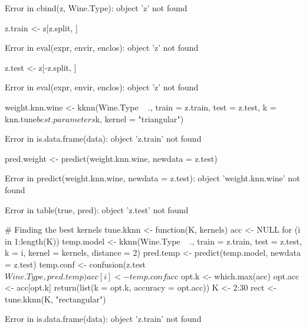 \documentclass[letterpaper]{article}\usepackage[]{graphicx}\usepackage[]{color}
\begin{document}
\begin{Schunk}
\begin{Soutput}
Error in cbind(z, Wine.Type): object 'z' not found
\end{Soutput}
\begin{Sinput}
z.train <- z[z.split, ]
\end{Sinput}
\begin{Soutput}
Error in eval(expr, envir, enclos): object 'z' not found
\end{Soutput}
\begin{Sinput}
z.test <- z[-z.split, ]
\end{Sinput}
\begin{Soutput}
Error in eval(expr, envir, enclos): object 'z' not found
\end{Soutput}
\begin{Sinput}
weight.knn.wine <- kknn(Wine.Type ~ ., train = z.train, test = z.test, k = knn.tune$best.parameters$k, 
    kernel = "triangular")
\end{Sinput}
\begin{Soutput}
Error in is.data.frame(data): object 'z.train' not found
\end{Soutput}
\begin{Sinput}
pred.weight <- predict(weight.knn.wine, newdata = z.test)
\end{Sinput}
\begin{Soutput}
Error in predict(weight.knn.wine, newdata = z.test): object 'weight.knn.wine' not found
\end{Soutput}
\begin{Soutput}
Error in table(true, pred): object 'z.test' not found
\end{Soutput}
\begin{Sinput}
# Finding the best kernels
tune.kknn <- function(K, kernels) {
    acc <- NULL
    for (i in 1:length(K)) {
        temp.model <- kknn(Wine.Type ~ ., train = z.train, test = z.test, k = i, 
            kernel = kernels, distance = 2)
        pred.temp <- predict(temp.model, newdata = z.test)
        temp.conf <- confusion(z.test$Wine.Type, pred.temp)
        acc[i] <- temp.conf$acc
    }
    opt.k <- which.max(acc)
    opt.acc <- acc[opt.k]
    return(list(k = opt.k, accuracy = opt.acc))
}
K <- 2:30
rect <- tune.kknn(K, "rectangular")
\end{Sinput}
\begin{Soutput}
Error in is.data.frame(data): object 'z.train' not found
\end{Soutput}

\end{Schunk}
\end{document}
